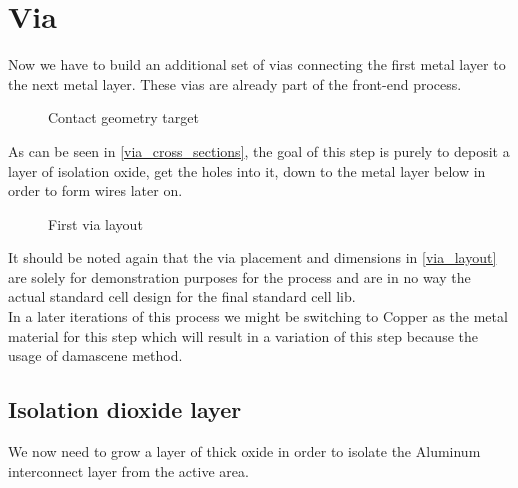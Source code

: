 \section{Via}\label{via}

Now we have to build an additional set of vias connecting the first metal layer to the next metal layer.
These vias are already part of the front-end process.

\begin{figure}[H]
	\centering
	\begin{tikzpicture}[node distance = 3cm, auto, thick,scale=\CrossSectionOnly, every node/.style={transform shape}]
		
	\end{tikzpicture}
	\caption{Contact geometry target}
	\label{via_cross_sections}
\end{figure}

As can be seen in \autoref{via_cross_sections}, the goal of this step is purely to deposit a layer of isolation oxide, get the holes into it, down to the metal layer below in order to form wires later on.

\begin{figure}[H]
	\centering
	\begin{tikzpicture}[node distance =1cm, auto, thick,scale=\VLSILayout, every node/.style={transform shape}]
		
	\end{tikzpicture}
	\caption{First via layout}
	\label{via_layout}
\end{figure}

It should be noted again that the via placement and dimensions in \autoref{via_layout} are solely for demonstration purposes for the process and are in no way the actual standard cell design for the final standard cell lib. \\

In a later iterations of this process we might be switching to Copper as the metal material for this step which will result in a variation of this step because the usage of damascene method.

\newpage

\subsection{Isolation dioxide layer}

We now need to grow a layer of thick oxide in order to isolate the Aluminum interconnect layer from the active area.

